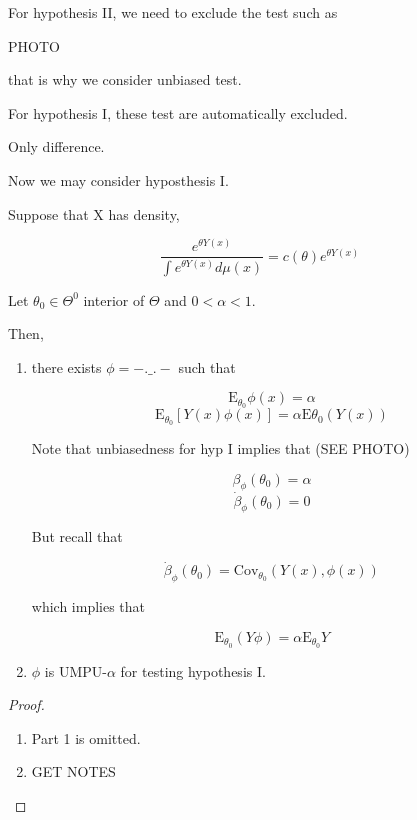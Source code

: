 \documentclass[11pt,fleqn]{book} %
\newcommand{\E}{\mathrm{E}}
\newcommand{\Cov}{\mathrm{Cov}}
\begin{document}
For hypothesis II, we need to exclude the test such as

PHOTO

that is why we consider unbiased test. 

For hypothesis I, these test are automatically excluded. 

Only difference. 



Now we may consider hyposthesis I. 

\begin{theorem}[3.8]
	Suppose that X has density,

		$$\frac{e^{\theta Y(x)}}{\int e^{\theta Y(x)} d\mu(x)} = c(\theta) e^{\theta Y(x)} $$

 	Let $\theta_0 \in \Theta^0$ interior of $\Theta$ and $0 < \alpha < 1$. 

 	Then, 

 		\begin{enumerate}
 			\item there exists $\phi = -.\_.-$ such that

 					$$\E_{\theta_0} \phi(x) = \alpha $$  
 					$$\E_{\theta_0} [Y(x) \phi(x)] = \alpha \E{\theta_0} (Y(x))$$

 			\begin{remark}
 				Note that unbiasedness for hyp I implies that (SEE PHOTO)

 						$$\beta_\phi(\theta_0) = \alpha $$
 						$$\dot{\beta}_{\phi} (\theta_0) = 0 $$

 				But recall that 

 						$$\dot{\beta}_\phi (\theta_0) = \Cov_{\theta_0} (Y(x), \phi(x)) $$

 				which implies that

 						$$\E_{\theta_0} (Y\phi) = \alpha \E_{\theta_0} Y $$
 			\end{remark}
 			\item  $\phi$ is UMPU-$\alpha$ for testing hypothesis  I.
 		\end{enumerate}

\end{theorem}

\begin{proof}
	\begin{enumerate}
		
		\item  Part 1 is omitted.
		\item  GET NOTES
	\end{enumerate}
\end{proof}
\end{document}
